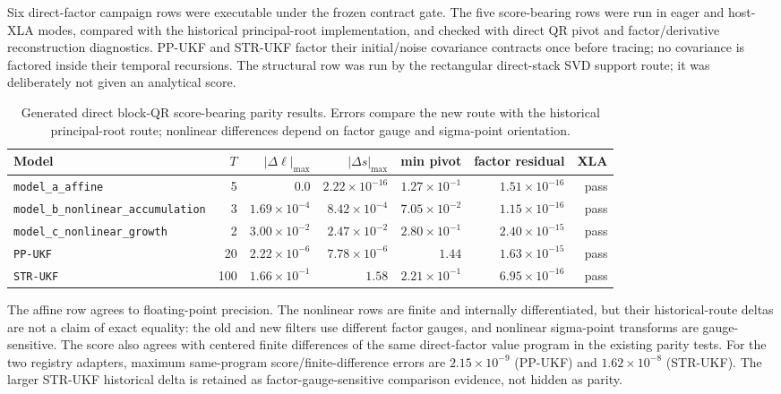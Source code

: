 \documentclass[11pt]{article}
\begin{document}
Six direct-factor campaign rows were executable under the frozen contract
gate. The five score-bearing rows were run in eager and host-XLA modes, compared with the
historical principal-root implementation, and checked with direct QR pivot and
factor/derivative reconstruction diagnostics. PP-UKF and STR-UKF factor their
initial/noise covariance contracts once before tracing; no covariance is
factored inside their temporal recursions. The structural row was run by
the rectangular direct-stack SVD support route; it was deliberately not given
an analytical score.

\begin{table}[ht]
\centering
\caption{Generated direct block-QR score-bearing parity results. Errors compare
the new route with the historical principal-root route; nonlinear differences
depend on factor gauge and sigma-point orientation.}
\label{tab:score-parity}
\begin{tabular}{lrrrrrr}
\toprule
Model & $T$ & $|\Delta \ell|_{\max}$ & $|\Delta s|_{\max}$ & min pivot & factor residual & XLA \\
\midrule
\texttt{model\_a\_affine} & 5 & $0.0$ & $2.22\times10^{-16}$ & $1.27\times10^{-1}$ & $1.51\times10^{-16}$ & pass \\
\texttt{model\_b\_nonlinear\_accumulation} & 3 & $1.69\times10^{-4}$ & $8.42\times10^{-4}$ & $7.05\times10^{-2}$ & $1.15\times10^{-16}$ & pass \\
\texttt{model\_c\_nonlinear\_growth} & 2 & $3.00\times10^{-2}$ & $2.47\times10^{-2}$ & $2.80\times10^{-1}$ & $2.40\times10^{-15}$ & pass \\
\texttt{PP-UKF} & 20 & $2.22\times10^{-6}$ & $7.78\times10^{-6}$ & $1.44$ & $1.63\times10^{-15}$ & pass \\
\texttt{STR-UKF} & 100 & $1.66\times10^{-1}$ & $1.58$ & $2.21\times10^{-1}$ & $6.95\times10^{-16}$ & pass \\
\bottomrule
\end{tabular}
\end{table}

The affine row agrees to floating-point precision. The nonlinear rows are
finite and internally differentiated, but their historical-route deltas are
not a claim of exact equality: the old and new filters use different factor
gauges, and nonlinear sigma-point transforms are gauge-sensitive. The score
also agrees with centered finite differences of the same direct-factor value
program in the existing parity tests. For the two registry adapters, maximum
same-program score/finite-difference errors are $2.15\times10^{-9}$ (PP-UKF)
and $1.62\times10^{-8}$ (STR-UKF). The larger STR-UKF historical delta is
retained as factor-gauge-sensitive comparison evidence, not hidden as parity.
\end{document}
